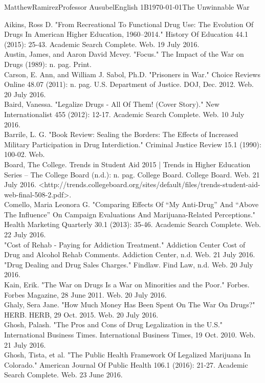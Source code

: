 \documentclass[12pt,letterpaper]{article}
\begin{document}
\begin{mla}{Matthew}{Ramirez}{Professor Ausubel}{English 1B}{\today}{The Unwinnable War}
\begin{workscited}
\bibent Aikins, Ross D. "From Recreational To Functional Drug Use: The Evolution Of Drugs In American Higher Education, 1960–2014." History Of Education 44.1 (2015): 25-43. Academic Search Complete. Web. 19 July 2016.\\
\bibent Austin, James, and Aaron David Mcvey. "Focus." The Impact of the War on Drugs (1989): n. pag. Print.\\
\bibent Carson, E. Ann, and William J. Sabol, Ph.D. "Prisoners in War." Choice Reviews Online 48.07 (2011): n. pag. U.S. Department of Justice. DOJ, Dec. 2012. Web. 20 July 2016.\\
\bibent Baird, Vanessa. "Legalize Drugs - All Of Them! (Cover Story)." New Internationalist 455 (2012): 12-17. Academic Search Complete. Web. 10 July 2016.\\
\bibent Barrile, L. G. "Book Review: Sealing the Borders: The Effects of Increased Military Participation in Drug Interdiction." Criminal Justice Review 15.1 (1990): 100-02. Web.\\
\bibent Board, The College. Trends in Student Aid 2015 | Trends in Higher Education Series – The College Board (n.d.): n. pag. College Board. College Board. Web. 21 July 2016. <http://trends.collegeboard.org/sites/default/files/trends-student-aid-web-final-508-2.pdf>.\\
\bibent Comello, Maria Leonora G. "Comparing Effects Of “My Anti-Drug” And “Above The Influence” On Campaign Evaluations And Marijuana-Related Perceptions." Health Marketing Quarterly 30.1 (2013): 35-46. Academic Search Complete. Web. 22 July 2016.\\
\bibent "Cost of Rehab - Paying for Addiction Treatment." Addiction Center Cost of Drug and Alcohol Rehab Comments. Addiction Center, n.d. Web. 21 July 2016.\\
\bibent "Drug Dealing and Drug Sales Charges." Findlaw. Find Law, n.d. Web. 20 July 2016.\\
\bibent Kain, Erik. "The War on Drugs Is a War on Minorities and the Poor." Forbes. Forbes Magazine, 28 June 2011. Web. 20 July 2016.\\
\bibent Ghaly, Sera Jane. "How Much Money Has Been Spent On The War On Drugs?" HERB. HERB, 29 Oct. 2015. Web. 20 July 2016.\\
\bibent Ghosh, Palash. "The Pros and Cons of Drug Legalization in the U.S." International Business Times. International Business Times, 19 Oct. 2010. Web. 21 July 2016.\\
\bibent Ghosh, Tista, et al. "The Public Health Framework Of Legalized Marijuana In Colorado." American Journal Of Public Health 106.1 (2016): 21-27. Academic Search Complete. Web. 23 June 2016.\\

\end{workscited}
\end{mla}
\end{document}
